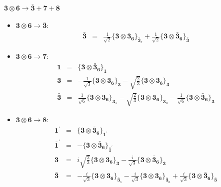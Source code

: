 \documentclass[english]{article}
\newcommand{\subcg}[3]{\big\{ {#1}\otimes{#2}\big\}^{}_{#3}}
\newcommand{\rep}[1]{\mathbf{#1}}
\begin{document}
\paragraph*{\Large $\rep{3}\otimes\rep{6}\to\rep{\bar{3}}+\rep{7}+\rep{8}$}
\begin{itemize}
\item $\rep{3}\otimes\rep{6}\to\rep{\bar{3}}$:
\begin{eqnarray*}
\rep{\bar{3}} &=& \frac{1}{\sqrt{2}}\subcg{\rep{3}}{\rep{3}_{\rep{6}}}{\rep{\bar{3}}_{s}}+\frac{1}{\sqrt{2}}\subcg{\rep{3}}{\rep{\bar{3}}_{\rep{6}}}{\rep{\bar{3}}}
\end{eqnarray*}
\item $\rep{3}\otimes\rep{6}\to\rep{7}$:
\begin{eqnarray*}
\rep{1} &=& \subcg{\rep{3}}{\rep{\bar{3}}_{\rep{6}}}{\rep{1}}
\\
\rep{3} &=& -\frac{1}{\sqrt{3}}\subcg{\rep{3}}{\rep{3}_{\rep{6}}}{\rep{3}}-\sqrt{\frac{2}{3}}\subcg{\rep{3}}{\rep{\bar{3}}_{\rep{6}}}{\rep{3}}
\\
\rep{\bar{3}} &=& \frac{1}{\sqrt{6}}\subcg{\rep{3}}{\rep{3}_{\rep{6}}}{\rep{\bar{3}}_{s}}-\sqrt{\frac{2}{3}}\subcg{\rep{3}}{\rep{3}_{\rep{6}}}{\rep{\bar{3}}_{a}}-\frac{1}{\sqrt{6}}\subcg{\rep{3}}{\rep{\bar{3}}_{\rep{6}}}{\rep{\bar{3}}}
\end{eqnarray*}
\item $\rep{3}\otimes\rep{6}\to\rep{8}$:
\begin{eqnarray*}
\rep{1^{\prime}} &=& \subcg{\rep{3}}{\rep{\bar{3}}_{\rep{6}}}{\rep{1^{\prime}}}
\\
\rep{\bar{1}^{\prime}} &=& -\subcg{\rep{3}}{\rep{\bar{3}}_{\rep{6}}}{\rep{\bar{1}^{\prime}}}
\\
\rep{3} &=& i \sqrt{\frac{2}{3}}\subcg{\rep{3}}{\rep{3}_{\rep{6}}}{\rep{3}}-\frac{i}{\sqrt{3}}\subcg{\rep{3}}{\rep{\bar{3}}_{\rep{6}}}{\rep{3}}
\\
\rep{\bar{3}} &=& -\frac{i}{\sqrt{3}}\subcg{\rep{3}}{\rep{3}_{\rep{6}}}{\rep{\bar{3}}_{s}}-\frac{i}{\sqrt{3}}\subcg{\rep{3}}{\rep{3}_{\rep{6}}}{\rep{\bar{3}}_{a}}+\frac{i}{\sqrt{3}}\subcg{\rep{3}}{\rep{\bar{3}}_{\rep{6}}}{\rep{\bar{3}}}
\end{eqnarray*}
\end{itemize}
\end{document}
